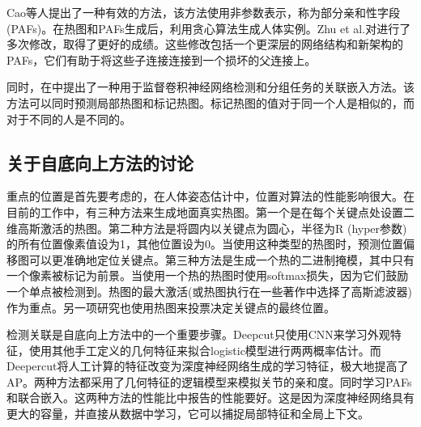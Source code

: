 \documentclass[hyperref]{ctexart}
\begin{document}
\begin{multicols}{2}
		Cao等人\cite{DBLP:conf/cvpr/CaoSWS17}提出了一种有效的方法，该方法使用非参数表示，称为部分亲和性字段(PAFs)。在热图和PAFs生成后，利用贪心算法生成人体实例。Zhu et al.\cite{zhu2017multi}对\cite{DBLP:conf/cvpr/CaoSWS17}进行了多次修改，取得了更好的成绩。这些修改包括一个更深层的网络结构和新架构的PAFs，它们有助于将这些子连接连接到一个损坏的父连接上。
		
		同时，在\cite{newell2017associative}中提出了一种用于监督卷积神经网络检测和分组任务的关联嵌入方法。该方法可以同时预测局部热图和标记热图。标记热图的值对于同一个人是相似的，而对于不同的人是不同的。
		\subsection{关于自底向上方法的讨论}
		重点的位置是首先要考虑的，在人体姿态估计中，位置对算法的性能影响很大。在目前的工作中，有三种方法来生成地面真实热图。第一个是在每个关键点\cite{DBLP:conf/cvpr/CaoSWS17}处设置二维高斯激活的热图。第二种方法是将圆内以关键点为圆心，半径为R (hyper参数)的所有位置像素值设为1，其他位置设为0\cite{DBLP:journals/corr/PapandreouZKTTB17}\cite{DBLP:conf/eccv/InsafutdinovPAA16}。当使用这种类型的热图时，预测位置偏移图可以更准确地定位关键点。第三种方法是生成一个热的二进制掩模，其中只有一个像素被标记为前景。当使用一个热的热图时使用softmax损失，因为它们鼓励一个单点被检测到\cite{he2017mask}。热图的最大激活(或热图执行在一些著作中选择了高斯滤波器)作为重点\cite{zhu2017multi}。另一项研究\cite{DBLP:journals/corr/PapandreouZKTTB17}也使用热图来投票决定关键点的最终位置。
		
		检测关联是自底向上方法中的一个重要步骤。Deepcut\cite{pishchulin2016deepcut}只使用CNN来学习外观特征，使用其他手工定义的几何特征来拟合logistic模型进行两两概率估计。而Deepercut\cite{DBLP:conf/eccv/InsafutdinovPAA16}将人工计算的特征改变为深度神经网络生成的学习特征，极大地提高了AP。两种方法都采用了几何特征的逻辑模型来模拟关节的亲和度。同时学习PAFs\cite{zhu2017multi}和联合嵌入\cite{newell2017associative}。这两种方法的性能比\cite{pishchulin2016deepcut}中报告的性能要好。这是因为深度神经网络具有更大的容量，并直接从数据中学习，它可以捕捉局部特征和全局上下文。
	\end{multicols}
\end{document}
